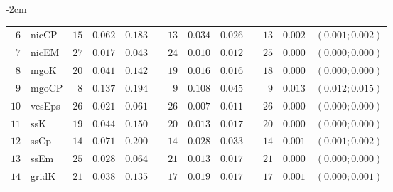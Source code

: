 \begin{table*}[!htbp]
\begin{adjustwidth*}{}{-2cm}
\begin{tabular}{@{}rlrrrrrrrrrcc@{}}
\footnotesize{$6 $} & \footnotesize{nicCP    } & \footnotesize{$15$} & \footnotesize{$0.062$} & \footnotesize{$0.183$} && \footnotesize{$13$} & \footnotesize{$0.034$} & \footnotesize{$0.026$} && \footnotesize{$13$} & \footnotesize{$0.002$} & \footnotesize{$(0.001;0.002)$} \\
\footnotesize{$7 $} & \footnotesize{nicEM    } & \footnotesize{$27$} & \footnotesize{$0.017$} & \footnotesize{$0.043$} && \footnotesize{$24$} & \footnotesize{$0.010$} & \footnotesize{$0.012$} && \footnotesize{$25$} & \footnotesize{$0.000$} & \footnotesize{$(0.000;0.000)$} \\
\footnotesize{$8 $} & \footnotesize{mgoK     } & \footnotesize{$20$} & \footnotesize{$0.041$} & \footnotesize{$0.142$} && \footnotesize{$19$} & \footnotesize{$0.016$} & \footnotesize{$0.016$} && \footnotesize{$18$} & \footnotesize{$0.000$} & \footnotesize{$(0.000;0.000)$} \\
\footnotesize{$9 $} & \footnotesize{mgoCP    } & \footnotesize{$8 $} & \footnotesize{$0.137$} & \footnotesize{$0.194$} && \footnotesize{$9 $} & \footnotesize{$0.108$} & \footnotesize{$0.045$} && \footnotesize{$9 $} & \footnotesize{$0.013$} & \footnotesize{$(0.012;0.015)$} \\
\footnotesize{$10$} & \footnotesize{vesEps   } & \footnotesize{$26$} & \footnotesize{$0.021$} & \footnotesize{$0.061$} && \footnotesize{$26$} & \footnotesize{$0.007$} & \footnotesize{$0.011$} && \footnotesize{$26$} & \footnotesize{$0.000$} & \footnotesize{$(0.000;0.000)$} \\
\footnotesize{$11$} & \footnotesize{ssK      } & \footnotesize{$19$} & \footnotesize{$0.044$} & \footnotesize{$0.150$} && \footnotesize{$20$} & \footnotesize{$0.013$} & \footnotesize{$0.017$} && \footnotesize{$20$} & \footnotesize{$0.000$} & \footnotesize{$(0.000;0.000)$} \\
\footnotesize{$12$} & \footnotesize{ssCp     } & \footnotesize{$14$} & \footnotesize{$0.071$} & \footnotesize{$0.200$} && \footnotesize{$14$} & \footnotesize{$0.028$} & \footnotesize{$0.033$} && \footnotesize{$14$} & \footnotesize{$0.001$} & \footnotesize{$(0.001;0.002)$} \\
\footnotesize{$13$} & \footnotesize{ssEm     } & \footnotesize{$25$} & \footnotesize{$0.028$} & \footnotesize{$0.064$} && \footnotesize{$21$} & \footnotesize{$0.013$} & \footnotesize{$0.017$} && \footnotesize{$21$} & \footnotesize{$0.000$} & \footnotesize{$(0.000;0.000)$} \\
\footnotesize{$14$} & \footnotesize{gridK    } & \footnotesize{$21$} & \footnotesize{$0.038$} & \footnotesize{$0.135$} && \footnotesize{$17$} & \footnotesize{$0.019$} & \footnotesize{$0.017$} && \footnotesize{$17$} & \footnotesize{$0.001$} & \footnotesize{$(0.000;0.001)$} \\

\end{tabular}
\end{adjustwidth*}
\end{table*}
